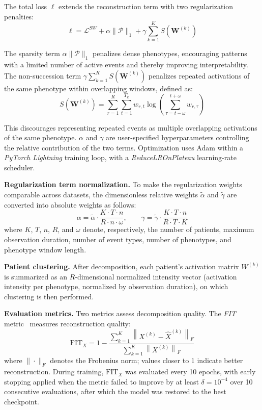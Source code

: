 \documentclass[a4paper]{cas-sc}
\newcommand{\proglang}[1]{\textit{#1}}
\begin{document}
The total loss $\ell$ extends the reconstruction term with two regularization penalties:
\begin{equation}
  \ell = \mathcal{L}^{SW} + \alpha\|\mathcal{P}\|_1 + \gamma\sum_{k=1}^{K}S\!\left(\boldsymbol{W}^{(k)}\right)
  \label{eq:loss}
\end{equation}
 
The sparsity term $\alpha\|\mathcal{P}\|_1$ penalizes dense phenotypes, encouraging patterns with a limited number of active events and thereby improving interpretability. 
The non-succession term $\gamma\sum_{k=1}^{K}S(\boldsymbol{W}^{(k)})$ penalizes repeated activations of the same phenotype within overlapping windows, defined as:
\begin{equation}
  S\!\left(\boldsymbol{W}^{(k)}\right) = \sum_{r=1}^{R}\sum_{t=1}^{T_k} w_{r,t} \log\!\left( \sum_{\tau=t-\omega}^{t+\omega}w_{r,\tau}
  \right)
  \label{eq:non_succession}
\end{equation}
 
This discourages representing repeated events as multiple overlapping activations of the same phenotype. 
$\alpha$ and $\gamma$ are user-specified hyperparameters controlling the relative contribution of the two terms. 
Optimization uses Adam within a \proglang{PyTorch Lightning} training loop, with a \emph{ReduceLROnPlateau} learning-rate scheduler.

\textbf{Regularization term normalization.}
To make the regularization weights comparable across datasets, the dimensionless relative weights $\tilde{\alpha}$ and $\tilde{\gamma}$ are converted into absolute weights as follows:
\begin{equation}
  \alpha = \tilde{\alpha}\cdot \frac{K\cdot T\cdot n}{R\cdot n\cdot\omega},
  \qquad
  \gamma = \tilde{\gamma}\cdot \frac{K\cdot T\cdot n}{R\cdot T\cdot K}
  \label{eq:normalized_reg}
\end{equation}
where $K$, $T$, $n$, $R$, and $\omega$ denote, respectively, the number of patients, maximum observation duration, number of event types, number of phenotypes, and phenotype window length.

\textbf{Patient clustering.}
After decomposition, each patient's activation matrix $W^{(k)}$ is summarized as an $R$-dimensional normalized intensity vector (activation intensity per phenotype, normalized by observation duration), on which clustering is then performed.

\textbf{Evaluation metrics.}
Two metrics assess decomposition quality. The \emph{FIT} metric~\cite{sebia2024swotted,Afshar2018} measures reconstruction quality:
\begin{equation}
  \mathrm{FIT}_X = 1- \frac{\sum_{k=1}^{K} \left\|X^{(k)}-\widehat{X}^{(k)}\right\|_F} {\sum_{k=1}^{K}\left\|X^{(k)}\right\|_F}
  \label{eq:fit}
\end{equation}
where $\|\cdot\|_F$ denotes the Frobenius norm; values closer to 1 indicate better reconstruction. During training, $\mathrm{FIT}_X$ was evaluated every 10 epochs, with early stopping applied when the metric failed to improve by at least $\delta=10^{-4}$ over 10 consecutive evaluations, after which the model was restored to the best checkpoint.
 
\end{document}
